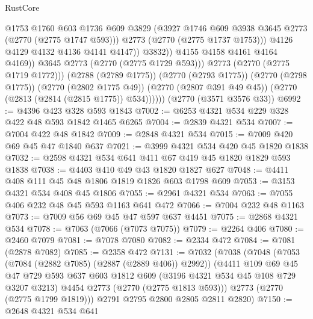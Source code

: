 \begin{lexlean}{RustCore}
\begin{coremodule}
                              @1753
                              @1760
                              @603
                              @1736
                              @609
                              @3829
                              (@3927 @1746 @609 @3938 @3645 @2773 (@2770 (@2775 @1747 @593)))
                              @2773
                              (@2770 (@2775 @1737 @1753)))
                            @4126
                            @4129
                            @4132
                            @4136
                            @4141
                            @4147))
                        @3832))
                    @4155
                    @4158
                    @4161
                    @4164
                    @4169))
                @3645
                @2773
                (@2770 (@2775 @1729 @593)))
              @2773
              (@2770 (@2775 @1719 @1772)))
            (@2788 (@2789 @1775))
            (@2770 (@2793 @1775))
            (@2770 (@2798 @1775))
            (@2770 (@2802 @1775 @49))
            (@2770 (@2807 @391 @49 @45))
            (@2770 (@2813 (@2814 (@2815 @1775)) @534))))))
    (@2770 (@3571 @3576 @33))
@6992 := @4396 @423 @328 @593 @1843
@7002 := @6253 @4321 @534 @229 @328 @422 @48 @593 @1842 @1465 @6265
@7004 := @2839 @4321 @534
@7007 := @7004 @422 @48 @1842
@7009 := @2848 @4321 @534
@7015 := @7009 @420 @69 @45 @47 @1840 @637
@7021 := @3999 @4321 @534 @420 @45 @1820 @1838
@7032 := @2598 @4321 @534 @641 @411 @67 @419 @45 @1820 @1829 @593 @1838
@7038 := @4403 @410 @49 @43 @1820 @1827 @627
@7048 := @4411 @408 @111 @45 @48 @1806 @1819 @1826 @603 @1798 @609
@7053 := @3153 @4321 @534 @408 @45 @1806
@7055 := @2961 @4321 @534
@7063 := @7055 @406 @232 @48 @45 @593 @1163 @641 @472
@7066 := @7004 @232 @48 @1163
@7073 := @7009 @56 @69 @45 @47 @597 @637 @4451
@7075 := @2868 @4321 @534
@7078 := @7063 (@7066 (@7073 @7075))
@7079 := @2264 @406
@7080 := @2460 @7079
@7081 := @7078 @7080
@7082 := @2334 @472
@7084 := @7081 (@2878 @7082)
@7085 := @2358 @472
@7131 := @7032
    (@7038
      (@7048
        (@7053 (@7084 (@2882 @7085) (@2887 (@2889 @406)) @2992))
        (@4411
          @109
          @69
          @45
          @47
          @729
          @593
          @637
          @603
          @1812
          @609
          (@3196 @4321 @534 @45 @108 @729 @3207 @3213)
          @4454
          @2773
          (@2770 (@2775 @1813 @593)))
        @2773
        (@2770 (@2775 @1799 @1819)))
      @2791
      @2795
      @2800
      @2805
      @2811
      @2820)
@7150 := @2648
    @4321
    @534
    @641

\end{coremodule}
\end{lexlean}
